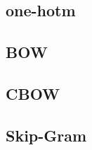 \documentclass[UTF8]{ctexart}
\begin{document}
\subsection{one-hotm}

\subsection{BOW}

\subsection{CBOW}

\subsection{Skip-Gram}













\end{document}
